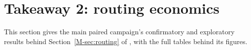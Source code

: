 \section{Takeaway 2: routing economics}\label{sec:c}

This section gives the main paired campaign's confirmatory and exploratory results behind
Section~\ref{M-sec:routing} of \mainpaper{}, with the full tables behind its figures.








